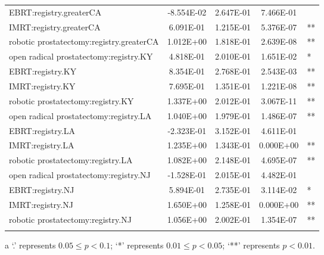 \documentclass[12pt]{article}
\begin{document}
{\begin{longtable}{lcccl}
  EBRT:registry.greaterCA & -8.554E-02 & 2.647E-01 & 7.466E-01 &  \\ 
  IMRT:registry.greaterCA & 6.091E-01 & 1.215E-01 & 5.376E-07 & ** \\ 
   robotic prostatectomy:registry.greaterCA & 1.012E+00 & 1.818E-01 & 2.639E-08 & ** \\ 
  open radical prostatectomy:registry.KY & 4.818E-01 & 2.010E-01 & 1.651E-02 & * \\ 
  EBRT:registry.KY & 8.354E-01 & 2.768E-01 & 2.543E-03 & ** \\ 
  IMRT:registry.KY & 7.695E-01 & 1.351E-01 & 1.221E-08 & ** \\ 
   robotic prostatectomy:registry.KY & 1.337E+00 & 2.012E-01 & 3.067E-11 & ** \\ 
  open radical prostatectomy:registry.LA & 1.040E+00 & 1.979E-01 & 1.486E-07 & ** \\ 
  EBRT:registry.LA & -2.323E-01 & 3.152E-01 & 4.611E-01 &  \\ 
  IMRT:registry.LA & 1.235E+00 & 1.343E-01 & 0.000E+00 & ** \\ 
   robotic prostatectomy:registry.LA & 1.082E+00 & 2.148E-01 & 4.695E-07 & ** \\ 
  open radical prostatectomy:registry.NJ & -1.528E-01 & 2.015E-01 & 4.482E-01 &  \\ 
  EBRT:registry.NJ & 5.894E-01 & 2.735E-01 & 3.114E-02 & * \\ 
  IMRT:registry.NJ & 1.650E+00 & 1.258E-01 & 0.000E+00 & ** \\ 
   robotic prostatectomy:registry.NJ & 1.056E+00 & 2.002E-01 & 1.354E-07 & ** \\ 
   \hline
\hline
\label{ALongTable}
\end{longtable}
\begin{tablenotes}
\item[a]\small{`.' represents $0.05 \leq p < 0.1$;  `*' represents $0.01 \leq p < 0.05$; `**' represents $p < 0.01$.}
\end{tablenotes}
}
\end{document}
